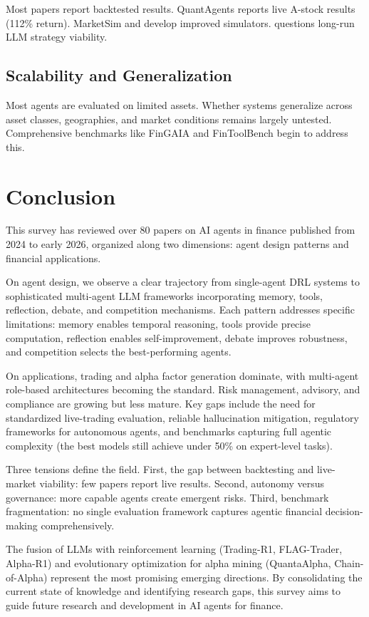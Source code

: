 \documentclass[12pt]{report}
\begin{document}
Most papers report backtested results. QuantAgents \citep{li2025quantagents} reports live A-stock results (112\% return). MarketSim \citep{gu2024marketsim} and \citet{lopezlira2025cantrade} develop improved simulators. \citet{li2025canllmoutperform} questions long-run LLM strategy viability.

\section{Scalability and Generalization}

Most agents are evaluated on limited assets. Whether systems generalize across asset classes, geographies, and market conditions remains largely untested. Comprehensive benchmarks like FinGAIA \citep{fingaia2025} and FinToolBench \citep{fintoolbench2026} begin to address this.


\chapter{Conclusion}

This survey has reviewed over 80 papers on AI agents in finance published from 2024 to early 2026, organized along two dimensions: agent design patterns and financial applications.

On agent design, we observe a clear trajectory from single-agent DRL systems to sophisticated multi-agent LLM frameworks incorporating memory, tools, reflection, debate, and competition mechanisms. Each pattern addresses specific limitations: memory enables temporal reasoning, tools provide precise computation, reflection enables self-improvement, debate improves robustness, and competition selects the best-performing agents.

On applications, trading and alpha factor generation dominate, with multi-agent role-based architectures becoming the standard. Risk management, advisory, and compliance are growing but less mature. Key gaps include the need for standardized live-trading evaluation, reliable hallucination mitigation, regulatory frameworks for autonomous agents, and benchmarks capturing full agentic complexity (the best models still achieve under 50\% on expert-level tasks).

Three tensions define the field. First, the gap between backtesting and live-market viability: few papers report live results. Second, autonomy versus governance: more capable agents create emergent risks. Third, benchmark fragmentation: no single evaluation framework captures agentic financial decision-making comprehensively.

The fusion of LLMs with reinforcement learning (Trading-R1, FLAG-Trader, Alpha-R1) and evolutionary optimization for alpha mining (QuantaAlpha, Chain-of-Alpha) represent the most promising emerging directions. By consolidating the current state of knowledge and identifying research gaps, this survey aims to guide future research and development in AI agents for finance.


\end{document}

